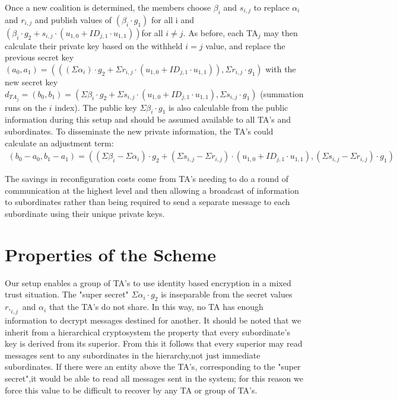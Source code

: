 \documentclass[10pt]{article}
\begin{document}
Once a new coalition is determined, the members choose $\beta_i$ and $s_{i,j}$ to replace $\alpha_i$ and $r_{i,j}$ and publish values of $(\beta_i \cdot g_1)$ for all i and $(\beta_i \cdot g_2 + s_{i,j} \cdot (u_{1,0} + ID_{j,1}\cdot u_{1,1}))$for all $i \neq j$.  As before, each TA$_j$ may then calculate their private key based on the withheld $i = j$ value, and replace the previous secret key $(a_0, a_1) = (((\Sigma \alpha_i)\cdot g_2 + \Sigma r_{i,j} \cdot (u_{1,0} + ID_{j,1}\cdot u_{1,1})), \Sigma r_{i,j} \cdot g_1)$ with the new secret key $d_{TA_j} = (b_0, b_1) = (\Sigma \beta_i \cdot g_2
 + \Sigma s_{i,j} \cdot (u_{1,0} + ID_{j,1}\cdot u_{1,1}), \Sigma s_{i,j} \cdot g_1)$ (summation runs on the $i$ index). The public key $\Sigma \beta_i \cdot g_1$ is also calculable from the public information during this setup and should be assumed available to all TA's and subordinates.   To disseminate the new private information, the TA's could calculate an adjustment term:
\begin{align*}
(b_0 - a_0, b_1 - a_1) = ((\Sigma \beta_i - \Sigma \alpha_i) \cdot g_2 + (\Sigma s_{i,j} - \Sigma r_{i,j})\cdot (u_{1,0} + ID_{j,1} \cdot u_{1,1}), (\Sigma s_{i,j} - \Sigma r_{i,j})\cdot g_1)
\end{align*}

The savings in reconfiguration costs come from TA’s needing to do a round of communication at the highest level and then allowing a broadcast of information to subordinates rather than being required to send a separate message to each subordinate using their unique private keys.

\section*{Properties of the Scheme}

Our setup enables a group of TA's to use identity based encryption in a mixed trust situation. The "super secret" $\Sigma \alpha_i \cdot g_2$ is inseparable from the secret values $r,_{i,j}$ and $\alpha_i$ that the TA's do not share. In this way, no TA has enough information to decrypt messages destined for another.  It should be noted that we inherit from a hierarchical cryptosystem the property that every subordinate's key is derived from its superior. From this  it follows that every superior may read messages sent to any subordinates in the hierarchy,not just immediate subordinates.  If there were an entity above the TA's, corresponding to the "super secret",it would be able to read all messages sent in the system; for this reason we force this value to be difficult to recover by any TA or group of TA's.
\end{document}
